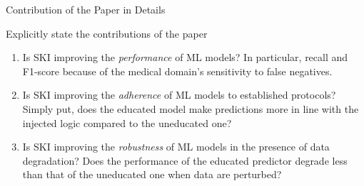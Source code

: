 \documentclass[presentation]{beamer} %
\begin{document}
{\begin{frame}{Contribution of the Paper in Details}
\begin{block}{Explicitly state the contributions of the paper}
    \begin{enumerate}
  \item[RQ1] Is  SKI improving the \emph{performance} of  ML models?
  In particular, recall and F1-score because of the medical domain's sensitivity to false negatives.
  \item[RQ2] Is  SKI improving the \emph{adherence} of  ML models to established protocols?
  Simply put, does the educated model make predictions more in line with the injected logic compared to the uneducated one?
  \item[RQ3] Is  SKI improving the \emph{robustness} of  ML models in the presence of data degradation?
  Does the performance of the educated predictor degrade less than that of the uneducated one when data are perturbed?
\end{enumerate}
\end{block}

\end{frame}
}
\end{document}
